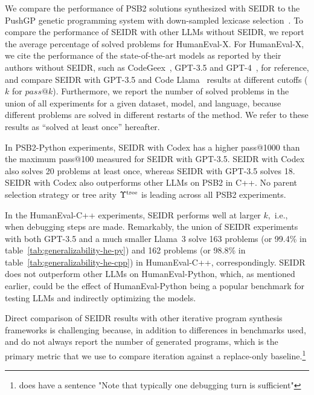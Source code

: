 We compare the performance of PSB2 solutions synthesized with SEIDR to the PushGP genetic programming system with down-sampled lexicase selection~\cite{helmuth2022:problemsolving}. 
To compare the performance of SEIDR with other LLMs without SEIDR, we report the average percentage of solved problems for HumanEval-X. 
For HumanEval-X, we cite the performance of the state-of-the-art models as reported by their authors without SEIDR, such as CodeGeex~\cite{zheng2023:codegeex}, GPT-3.5 and GPT-4~\cite{achiamGpt4TechnicalReport2023}, for reference, and compare SEIDR with GPT-3.5 and Code Llama~\cite{roziereCodeLlamaOpen2024} results at different cutoffs ($k$ for $pass@k$).
Furthermore, we report the number of solved problems in the union of all experiments for a given dataset, model, and language, because different problems are solved in different restarts of the method. 
We refer to these results as ``solved at least once'' hereafter.

In PSB2-Python experiments, SEIDR with Codex has a higher pass@1000 than the maximum pass@100 measured for SEIDR with GPT-3.5. SEIDR with Codex also solves 20 problems at least once, whereas SEIDR with GPT-3.5 solves 18.
SEIDR with Codex also outperforms other LLMs on PSB2 in C++.
No parent selection strategy or tree arity $\Upsilon^\text{tree}$ is leading across all PSB2 experiments. 

In the HumanEval-C++ experiments, SEIDR performs well at larger $k,$ i.e., when debugging steps are made. 
Remarkably, the union of SEIDR experiments with both GPT-3.5 and a much smaller Llama~3 solve 163 problems (or 99.4\% in table~\ref{tab:generalizability-he-py}) and 162 problems (or 98.8\% in table~\ref{tab:generalizability-he-cpp}) in HumanEval-C++, correspondingly.
SEIDR does not outperform other LLMs on HumanEval-Python, which, as mentioned earlier, could be the effect of HumanEval-Python being a popular benchmark for testing LLMs and indirectly optimizing the models.

Direct comparison of SEIDR results with other iterative program synthesis frameworks is challenging because, in addition to differences in benchmarks used, \cite{jiangSelfEvolveCodeEvolution2023} and \cite{chenTeachingLargeLanguage2023} do not always report the number of generated programs, which is the primary metric that we use to compare iteration against a replace-only baseline.\footnote{\cite{chenTeachingLargeLanguage2023} does have a sentence "Note that typically one debugging turn is sufficient"}


